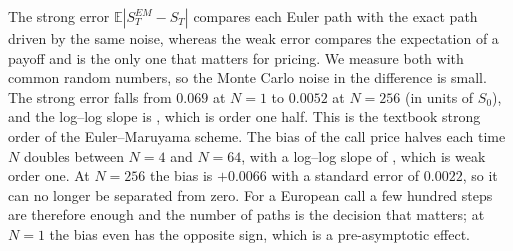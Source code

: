 The strong error $\mathbb E|S^{EM}_T-S_T|$ compares each Euler path with the exact path driven by the same noise, whereas the weak error compares the expectation of a payoff and is the only one that matters for pricing.
We measure both with common random numbers, so the Monte Carlo noise in the difference is small.
The strong error falls from $0.069$ at $N=1$ to $0.0052$ at $N=256$ (in units of $S_0$), and the log--log slope is \EMstrongSlope, which is order one half.
This is the textbook strong order of the Euler--Maruyama scheme.
The bias of the call price halves each time $N$ doubles between $N=4$ and $N=64$, with a log--log slope of \EMweakSlope, which is weak order one.
At $N=256$ the bias is $+0.0066$ with a standard error of $0.0022$, so it can no longer be separated from zero.
For a European call a few hundred steps are therefore enough and the number of paths is the decision that matters; at $N=1$ the bias even has the opposite sign, which is a pre-asymptotic effect.
